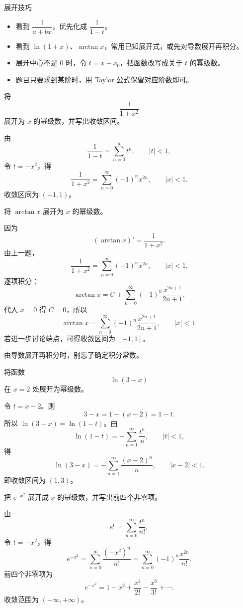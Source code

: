 \begin{methodbox}{展开技巧}
\begin{itemize}
  \item 看到 $\dfrac1{a+bx}$，优先化成 $\dfrac1{1-t}$。
  \item 看到 $\ln(1+x)$、$\arctan x$，常用已知展开式，或先对导数展开再积分。
  \item 展开中心不是 $0$ 时，令 $t=x-x_0$，把函数改写成关于 $t$ 的幂级数。
  \item 题目只要求到某阶时，用 Taylor 公式保留对应阶数即可。
\end{itemize}
\end{methodbox}

\begin{problem}
将
\[
  \frac1{1+x^2}
\]
展开为 $x$ 的幂级数，并写出收敛区间。
\end{problem}
\begin{solution}
由
\[
  \frac1{1-t}=\sum_{n=0}^{\infty}t^n,\qquad |t|<1,
\]
令 $t=-x^2$，得
\[
  \frac1{1+x^2}=\sum_{n=0}^{\infty}(-1)^n x^{2n},\qquad |x|<1.
\]
收敛区间为 $(-1,1)$。
\end{solution}

\begin{problem}
将 $\arctan x$ 展开为 $x$ 的幂级数。
\end{problem}
\begin{solution}
因为
\[
  (\arctan x)'=\frac1{1+x^2}.
\]
由上一题，
\[
  \frac1{1+x^2}=\sum_{n=0}^{\infty}(-1)^n x^{2n},\qquad |x|<1.
\]
逐项积分：
\[
  \arctan x=C+\sum_{n=0}^{\infty}(-1)^n\frac{x^{2n+1}}{2n+1}.
\]
代入 $x=0$ 得 $C=0$，所以
\[
  \arctan x=\sum_{n=0}^{\infty}(-1)^n\frac{x^{2n+1}}{2n+1},\qquad |x|<1.
\]
若进一步讨论端点，可得收敛区间为 $[-1,1]$。
\end{solution}
\begin{note}
由导数展开再积分时，别忘了确定积分常数。
\end{note}

\begin{problem}
将函数
\[
  \ln(3-x)
\]
在 $x=2$ 处展开为幂级数。
\end{problem}
\begin{solution}
令 $t=x-2$。则
\[
  3-x=1-(x-2)=1-t.
\]
所以 $\ln(3-x)=\ln(1-t)$。由
\[
  \ln(1-t)=-\sum_{n=1}^{\infty}\frac{t^n}{n},\qquad |t|<1,
\]
得
\[
  \ln(3-x)=-\sum_{n=1}^{\infty}\frac{(x-2)^n}{n},\qquad |x-2|<1.
\]
即收敛区间为 $(1,3)$。
\end{solution}

\begin{problem}
把 $e^{-x^2}$ 展开成 $x$ 的幂级数，并写出前四个非零项。
\end{problem}
\begin{solution}
由
\[
  e^t=\sum_{n=0}^{\infty}\frac{t^n}{n!},
\]
令 $t=-x^2$，得
\[
  e^{-x^2}=\sum_{n=0}^{\infty}\frac{(-x^2)^n}{n!}
  =\sum_{n=0}^{\infty}(-1)^n\frac{x^{2n}}{n!}.
\]
前四个非零项为
\[
  e^{-x^2}=1-x^2+\frac{x^4}{2!}-\frac{x^6}{3!}+\cdots.
\]
收敛范围为 $(-\infty,+\infty)$。
\end{solution}

